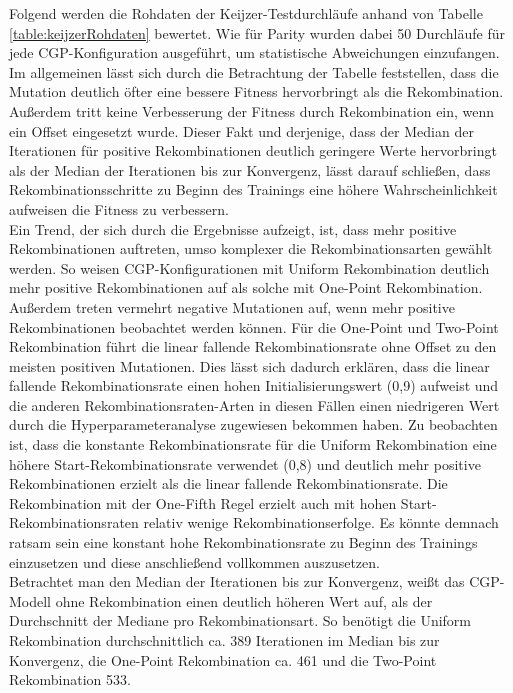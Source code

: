 Folgend werden die Rohdaten der Keijzer-Testdurchläufe anhand von Tabelle \ref{table:keijzerRohdaten} bewertet.
Wie für Parity wurden dabei 50 Durchläufe für jede CGP-Konfiguration ausgeführt, um statistische Abweichungen einzufangen.
Im allgemeinen lässt sich durch die Betrachtung der Tabelle feststellen, dass die Mutation deutlich öfter eine bessere Fitness hervorbringt als die Rekombination.
Außerdem tritt keine Verbesserung der Fitness durch Rekombination ein, wenn ein Offset eingesetzt wurde.
Dieser Fakt und derjenige, dass der Median der Iterationen für positive Rekombinationen deutlich geringere Werte hervorbringt als der Median der Iterationen bis zur Konvergenz, lässt darauf schließen, dass Rekombinationsschritte zu Beginn des Trainings eine höhere Wahrscheinlichkeit aufweisen die Fitness zu verbessern.\\
Ein Trend, der sich durch die Ergebnisse aufzeigt, ist, dass mehr positive Rekombinationen auftreten, umso komplexer die Rekombinationsarten gewählt werden.
So weisen CGP-Konfigurationen mit Uniform Rekombination deutlich mehr positive Rekombinationen auf als solche mit One-Point Rekombination.
Außerdem treten vermehrt negative Mutationen auf, wenn mehr positive Rekombinationen beobachtet werden können.
Für die One-Point und Two-Point Rekombination führt die linear fallende Rekombinationsrate ohne Offset zu den meisten positiven Mutationen.
Dies lässt sich dadurch erklären, dass die linear fallende Rekombinationsrate einen hohen Initialisierungswert (0,9) aufweist und die anderen Rekombinationsraten-Arten in diesen Fällen einen niedrigeren Wert durch die Hyperparameteranalyse zugewiesen bekommen haben.
Zu beobachten ist, dass die konstante Rekombinationsrate für die Uniform Rekombination eine höhere Start-Rekombinationsrate verwendet (0,8) und deutlich mehr positive Rekombinationen erzielt als die linear fallende Rekombinationsrate.
Die Rekombination mit der One-Fifth Regel erzielt auch mit hohen Start-Rekombinationsraten relativ wenige Rekombinationserfolge.
Es könnte demnach ratsam sein eine konstant hohe Rekombinationsrate zu Beginn des Trainings einzusetzen und diese anschließend vollkommen auszusetzen.\\
Betrachtet man den Median der Iterationen bis zur Konvergenz, weißt das CGP-Modell ohne Rekombination einen deutlich höheren Wert auf, als der Durchschnitt der Mediane pro Rekombinationsart. 
So benötigt die Uniform Rekombination durchschnittlich ca. 389 Iterationen im Median bis zur Konvergenz, die One-Point Rekombination ca. 461 und die Two-Point Rekombination 533.
